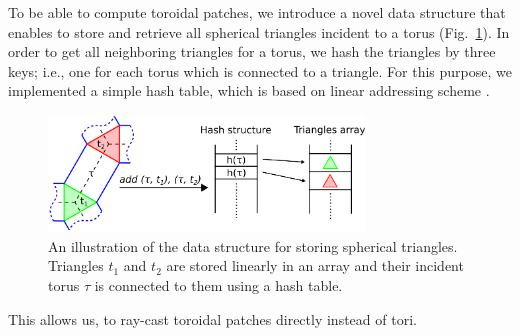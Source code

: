 


To be able to compute toroidal patches, we introduce a novel data structure that enables to store and retrieve all spherical triangles incident to a torus (Fig.~\ref{fig:hashing41}). In order to get all neighboring triangles for a torus, we hash the triangles by three keys; i.e., one for each torus which is connected to a triangle.
For this purpose, we implemented a simple hash table, which is based on linear addressing scheme \cite{alcantara2011efficient}.
\begin{figure}[htb]
  \centering
  \includegraphics[width=3.3in]{image/hashing.png}
  \caption{An illustration of the data structure for storing spherical triangles. Triangles $t_1$ and $t_2$ are stored linearly in an array and their incident torus $\tau$ is connected to them using a hash table.}
	\label{fig:hashing41}
\end{figure}
This allows us, to ray-cast toroidal patches directly instead of tori.

